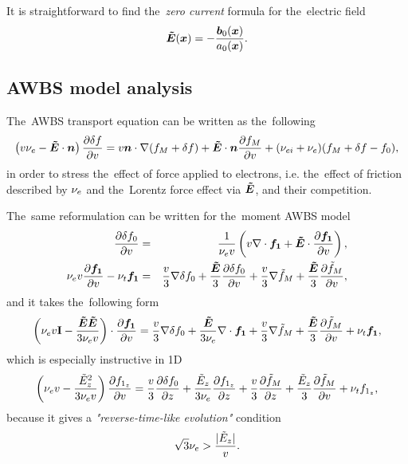 \documentclass[preprint,12pt]{elsarticle}
\newcounter{bla}
\begin{document}
It is straightforward to find the~\textit{zero current} formula for 
the~electric field
\begin{equation}
  \boldsymbol{\tilde{E}}(\boldsymbol{x}) = -\frac{\boldsymbol{b}_{0}(\boldsymbol{x})}{a_{0}(\boldsymbol{x})} .
  \label{eq:OOE_E_j0}
\end{equation}

\subsection{AWBS model analysis}
\label{sec:OOE_AWBS_model_analysis}
The~AWBS transport equation can be written as the~following
\begin{multline}
  \left(v \nu_{e} - \boldsymbol{\tilde{E}}\cdot\boldsymbol{n}\right)\frac{\partial{\delta f}}{\partial{v}} 
  =
  v\boldsymbol{n}\cdot\nabla (f_M + \delta f) + \boldsymbol{\tilde{E}}\cdot\boldsymbol{n}\frac{\partial{f_M}}{\partial{v}} 
  + (\nu_{ei} + \nu_{e}) (f_M + \delta f - f_0) ,
  \label{eq:OOE_AWBS_model_analysis}
\end{multline}
in order to stress the~effect of force applied to electrons, i.e. the~effect
of friction described by $\nu_{e}$ and the~Lorentz force effect via $\boldsymbol{\tilde{E}}$, 
and their competition.

The~same reformulation can be written for the~moment AWBS model
\begin{eqnarray}
  \frac{\partial{\delta f_0}}{\partial{v}} &=&
  \frac{1}{\nu_{e}v}\left(v\nabla\cdot\boldsymbol{f_1} + \boldsymbol{\tilde{E}}\cdot
  \frac{\partial{\boldsymbol{f_1}}}{\partial{v}}\right) , 
  \nonumber\\
  \nu_{e}v\frac{\partial{\boldsymbol{f_1}}}{\partial{v}} - \nu_{t}\boldsymbol{f_1} &=& 
  \frac{v}{3}\nabla\delta f_0 + 
  \frac{\boldsymbol{\tilde{E}}}{3}\frac{\partial{\delta f_0}}{\partial{v}}
  + \frac{v}{3}\nabla\tilde{f}_M + \frac{\boldsymbol{\tilde{E}}}{3}\frac{\partial{\tilde{f}_M}}{\partial{v}} ,
  \nonumber
\end{eqnarray}
and it takes the~following form
\begin{equation}
  \left(\nu_{e}v\mathbf{I} - \frac{\boldsymbol{\tilde{E}}\boldsymbol{\tilde{E}}}{3 \nu_{e}v}\right)\cdot
  \frac{\partial{\boldsymbol{f_1}}}{\partial{v}} = 
  \frac{v}{3}\nabla\delta f_0 + \frac{\boldsymbol{\tilde{E}}}{3 \nu_{e}}\nabla\cdot\boldsymbol{f_1}
  + \frac{v}{3}\nabla\tilde{f}_M + \frac{\boldsymbol{\tilde{E}}}{3}\frac{\partial{\tilde{f}_M}}{\partial{v}} 
  + \nu_{t}\boldsymbol{f_1} ,
  \nonumber \label{eq:OOE_P1AWBS_model_analysis}
\end{equation}
which is especially instructive in 1D
\begin{equation}
  \left(\nu_{e}v - \frac{\tilde{E}_z^2}{3 \nu_{e}v}\right)
  \frac{\partial{f_{1_z}}}{\partial{v}} = 
  \frac{v}{3}\frac{\partial{\delta f_0}}{\partial{z}} + \frac{\tilde{E}_z}{3 \nu_{e}}\frac{\partial{f_{1_z}}}{\partial{z}}
  + \frac{v}{3}\frac{\partial{\tilde{f}_M}}{\partial{z}} + \frac{\tilde{E}_z}{3}\frac{\partial{\tilde{f}_M}}{\partial{v}} 
  + \nu_{t}f_{1_z} ,
  \label{eq:OOE_P1AWBS_model_1Danalysis}
\end{equation}
because it gives a \textit{"reverse-time-like evolution"} condition
\begin{equation}
  \sqrt{3} \nu_{e} > \frac{|\tilde{E}_z|}{v} .
  \label{eq:OOE_reverse_time_condition}
\end{equation}
\end{document}
